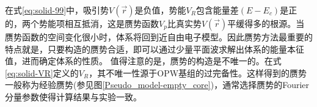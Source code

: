 在式\eqref{eq:solid-99}中，吸引势$V(\vec r)$是负值，势能$V_R$包含能量差$(E-E_c)$是正的，两个势能项相互抵消，这是赝势函数$V_p$比真实势$V(\vec r)$平缓得多的根源。当赝势函数的空间变化很小时，体系将回到近自由电子模型。因此赝势方法最重要的特点就是，只要构造的赝势合适，即可以通过少量平面波求解出体系的能量本征值，进而确定体系的性质。
值得注意的是，赝势的构造是不唯一的。在式\eqref{eq:solid-VR}定义的$V_R$，其不唯一性源于OPW基组的过完备性。这样得到的赝势一般称为经验赝势(参见图\ref{Pseudo_model-empty_core})，通常选择赝势的Fourier分量参数使得计算结果与实验一致。

